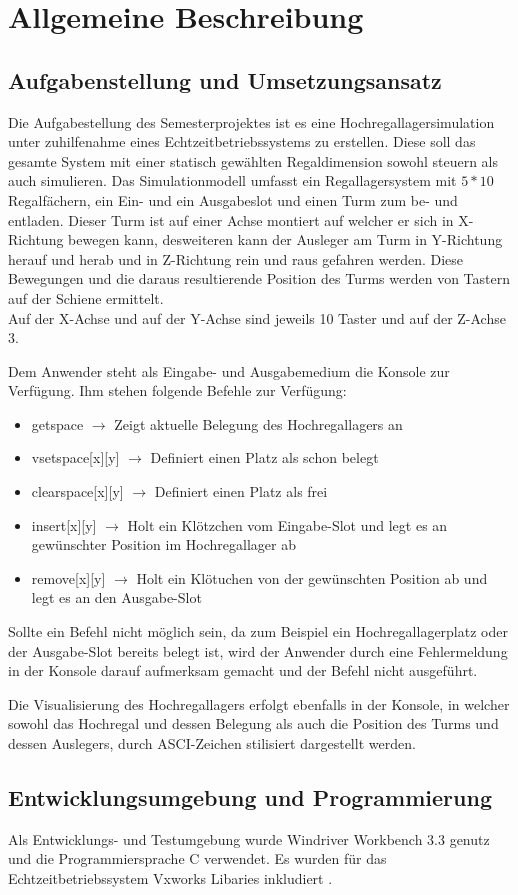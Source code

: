 \section{Allgemeine Beschreibung}
\subsection{Aufgabenstellung und Umsetzungsansatz}
Die Aufgabestellung des Semesterprojektes ist es eine Hochregallagersimulation unter zuhilfenahme eines Echtzeitbetriebssystems zu erstellen. Diese soll das gesamte System mit einer statisch gewählten Regaldimension sowohl steuern als auch simulieren.
Das Simulationmodell umfasst ein Regallagersystem mit $5*10$ Regalfächern, ein Ein- und ein Ausgabeslot und einen Turm zum be- und entladen. Dieser Turm ist auf einer Achse montiert auf welcher er sich in X-Richtung bewegen kann, desweiteren kann der Ausleger am Turm in Y-Richtung herauf und herab und in Z-Richtung rein und raus gefahren werden. Diese Bewegungen und die daraus resultierende Position des Turms werden von Tastern auf der Schiene ermittelt.\\
Auf der X-Achse und auf der Y-Achse sind jeweils 10 Taster und auf der Z-Achse 3.

Dem Anwender steht als Eingabe- und Ausgabemedium die Konsole zur Verfügung.
\newline\newline
Ihm stehen folgende Befehle zur Verfügung:
\begin{itemize} 
	\item getspace $\rightarrow$ Zeigt aktuelle Belegung des Hochregallagers an
	\item vsetspace[x][y] $\rightarrow$ Definiert einen Platz als schon belegt
	\item clearspace[x][y] $\rightarrow$ Definiert einen Platz als frei
	\item insert[x][y] $\rightarrow$ Holt ein Klötzchen vom Eingabe-Slot und legt es an gewünschter Position im Hochregallager ab
	\item remove[x][y] $\rightarrow$ Holt ein Klötuchen von der gewünschten Position ab und legt es an den Ausgabe-Slot
\end{itemize}

Sollte ein Befehl nicht möglich sein, da zum Beispiel ein Hochregallagerplatz oder der Ausgabe-Slot bereits belegt ist, wird der Anwender durch eine Fehlermeldung in der Konsole darauf aufmerksam gemacht und der Befehl nicht ausgeführt.

Die Visualisierung des Hochregallagers erfolgt ebenfalls in der Konsole, in welcher sowohl das Hochregal und dessen Belegung als auch die Position des Turms und dessen Auslegers, durch ASCI-Zeichen stilisiert dargestellt werden.

\subsection{Entwicklungsumgebung und Programmierung}
Als Entwicklungs- und Testumgebung wurde Windriver Workbench 3.3 genutz und die Programmiersprache C verwendet.
Es wurden für das Echtzeitbetriebssystem Vxworks Libaries inkludiert .


